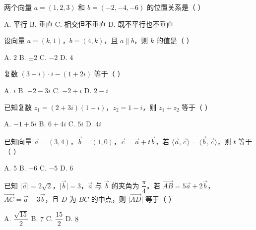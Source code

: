 \documentclass[11pt, a4paper]{article}
\begin{document}
\begin{baitap}[7]
两个向量 $a=(1,2,3)$ 和 $b=(-2,-4,-6)$ 的位置关系是（ ）
\par\vspace{3pt}
\noindent A. 平行 \quad B. 垂直 \quad C. 相交但不垂直 \quad D. 既不平行也不垂直
\end{baitap}

\begin{baitap}[8]
设向量 $a=(k,1)$，$b=(4,k)$，且 $a\parallel b$，则 $k$ 的值是（ ）
\par\vspace{3pt}
\noindent A. $2$ \quad B. $\pm 2$ \quad C. $-2$ \quad D. $4$
\end{baitap}

\begin{baitap}[9]
复数 $(3-i)\cdot i-(1+2i)$ 等于（ ）
\par\vspace{3pt}
\noindent A. $i$ \quad B. $-2-3i$ \quad C. $-2+i$ \quad D. $2-i$
\end{baitap}

\begin{baitap}[10]
已知复数 $z_1=(2+3i)(1+i)$，$z_2=1-i$，则 $z_1+z_2$ 等于（ ）
\par\vspace{3pt}
\noindent A. $-1+5i$ \quad B. $6+4i$ \quad C. $5i$ \quad D. $4i$
\end{baitap}

\begin{baitap}[11]
已知向量 $\vec{a}=(3,4)$，$\vec{b}=(1,0)$，$\vec{c}=\vec{a}+t\vec{b}$，若 $\langle\vec{a},\vec{c}\rangle=\langle\vec{b},\vec{c}\rangle$，则 $t$ 等于（ ）
\par\vspace{3pt}
\noindent A. $5$ \quad B. $-6$ \quad C. $-5$ \quad D. $6$
\end{baitap}

\begin{baitap}[12]
已知 $\lvert\overrightarrow{a}\rvert=2\sqrt{2}$，$\lvert\overrightarrow{b}\rvert=3$，$\overrightarrow{a}$ 与 $\overrightarrow{b}$ 的夹角为 $\dfrac{\pi}{4}$。若 $\overrightarrow{AB}=5\overrightarrow{a}+2\overrightarrow{b}$，$\overrightarrow{AC}=\overrightarrow{a}-3\overrightarrow{b}$，且 $D$ 为 $BC$ 的中点，则 $\lvert\overrightarrow{AD}\rvert$ 等于（ ）
\par\vspace{3pt}
\noindent A. $\dfrac{\sqrt{15}}{2}$ \quad B. $7$ \quad C. $\dfrac{15}{2}$ \quad D. $8$
\end{baitap}
\end{document}
